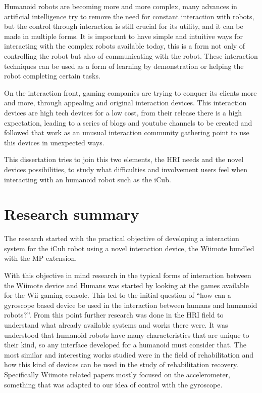 

	Humanoid robots are becoming more and more complex, many advances in artificial intelligence try to remove the need for constant interaction with robots, but the control through interaction is still crucial for its utility, and it can be made in multiple forms. It is important to have simple and intuitive ways for interacting with the complex robots available today, this is a form not only of controlling the robot but also of communicating with the robot. These interaction techniques can be used as a form of learning by demonstration or helping the robot completing certain tasks.

	On the interaction front, gaming companies are trying to conquer its clients more and more, through appealing and original interaction devices. This interaction devices are high tech devices for a low cost, from their release there is a high expectation, leading to a series of blogs and youtube channels to be created and followed that work as an unusual interaction community gathering point to use this devices in unexpected ways.

	This dissertation tries to join this two elements, the \ac{HRI} needs and the novel devices possibilities, to study what difficulties and involvement users feel when interacting with an humanoid robot such as the iCub.

\section{Research summary}

	The research started with the practical objective of developing a interaction system for the iCub robot using a novel interaction device, the Wiimote bundled with the \ac{MP} extension.

	With this objective in mind research in the typical forms of interaction between the \ac{Wiimote} device and Humans was started by looking at the games available for the Wii gaming console. This led to the initial question of ``how can a gyroscope based device be used in the interaction between humans and humanoid robots?''. From this point further research was done in the \ac{HRI} field to understand what already available systems and works there were. It was understood that humanoid robots have many characteristics that are unique to their kind, so any interface developed for a humanoid must consider that. The most similar and interesting works studied were in the field of rehabilitation and how this kind of devices can be used in the study of rehabilitation recovery. Specifically \ac{Wiimote} related papers mostly focused on the accelerometer, something that was adapted to our idea of control with the gyroscope.

